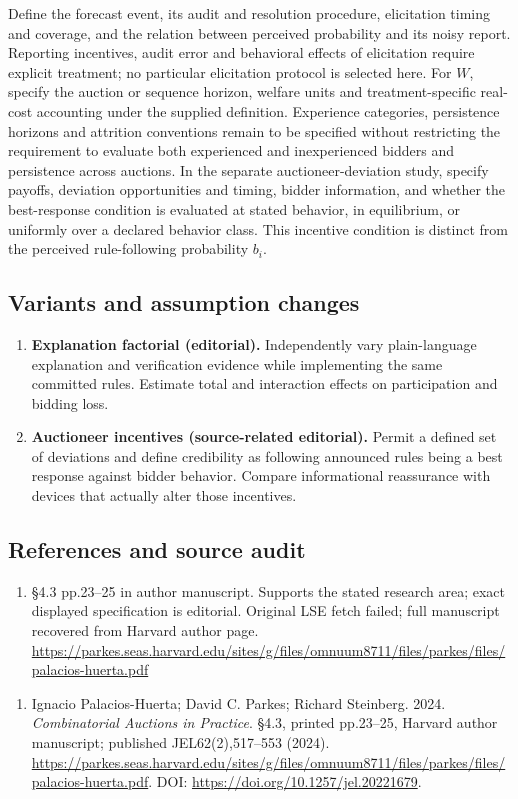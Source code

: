 \documentclass[11pt,a4paper]{article}
\begin{document}
Define the forecast event, its audit and resolution procedure, elicitation timing and coverage, and the relation between perceived probability and its noisy report. Reporting incentives, audit error and behavioral effects of elicitation require explicit treatment; no particular elicitation protocol is selected here. For \(W\), specify the auction or sequence horizon, welfare units and treatment-specific real-cost accounting under the supplied definition. Experience categories, persistence horizons and attrition conventions remain to be specified without restricting the requirement to evaluate both experienced and inexperienced bidders and persistence across auctions. In the separate auctioneer-deviation study, specify payoffs, deviation opportunities and timing, bidder information, and whether the best-response condition is evaluated at stated behavior, in equilibrium, or uniformly over a declared behavior class. This incentive condition is distinct from the perceived rule-following probability \(b_i\).
\subsection*{Variants and assumption changes}
\begin{enumerate}
\item \textbf{Explanation factorial (editorial).} Independently vary plain-language explanation and verification evidence while implementing the same committed rules. Estimate total and interaction effects on participation and bidding loss.
\item \textbf{Auctioneer incentives (source-related editorial).} Permit a defined set of deviations and define credibility as following announced rules being a best response against bidder behavior. Compare informational reassurance with devices that actually alter those incentives.
\end{enumerate}
\subsection*{References and source audit}
\begin{enumerate}
\item §4.3 pp.23–25 in author manuscript. Supports the stated research area; exact displayed specification is editorial. Original LSE fetch failed; full manuscript recovered from Harvard author page. \url{https://parkes.seas.harvard.edu/sites/g/files/omnuum8711/files/parkes/files/palacios-huerta.pdf}
\end{enumerate}
\begin{enumerate}\raggedright
\item\hypertarget{definitions:source:30007577:1}{} Ignacio Palacios-Huerta; David C. Parkes; Richard Steinberg. 2024. \emph{Combinatorial Auctions in Practice}. §4.3, printed pp.23–25, Harvard author manuscript; published JEL62(2),517–553 (2024).
\url{https://parkes.seas.harvard.edu/sites/g/files/omnuum8711/files/parkes/files/palacios-huerta.pdf}.
DOI: \url{https://doi.org/10.1257/jel.20221679}.
\end{enumerate}
\end{document}
